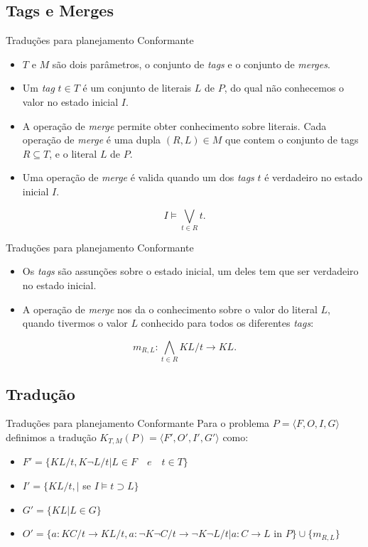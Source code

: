 \subsection{Tags e Merges}
\begin{frame}{Traduções para planejamento Conformante}
\begin{itemize}
\item $T$ e $M$ são dois parâmetros, o conjunto de \textit{tags} e o conjunto de 
\textit{merges}. 
\item Um \textit{tag} $t \in T$ é um conjunto de literais $L$ de $P$, do qual 
não conhecemos o valor no estado inicial $I$. 
\item A operação de \textit{merge} permite obter conhecimento sobre literais. 
Cada operação de \textit{merge} é uma dupla $(R,L) \in M$ que contem o conjunto 
de tags $R \subseteq T$, e o literal $L$ de $P$. 
\item Uma operação de \textit{merge} é valida quando um dos \textit{tags} $t$ é 
verdadeiro no estado inicial $I$. 
\end{itemize}
\begin{equation*}
I \models \bigvee_{t \in R} t.
\end{equation*}
\end{frame}

\begin{frame}{Traduções para planejamento Conformante}
\begin{itemize}
\item Os \textit{tags} são assunções sobre o estado inicial, um deles tem que 
ser verdadeiro no estado inicial.
\item A operação de \textit{merge} nos da o conhecimento sobre o valor do 
literal $L$, quando tivermos o valor $L$ conhecido para todos os diferentes 
\textit{tags}:
\end{itemize}
\begin{equation*}
m_{R,L} : \bigwedge_{t \in R} KL/t \rightarrow KL.
\end{equation*}
\end{frame}

\subsection{Tradução}
\begin{frame}{Traduções para planejamento Conformante}
Para o problema $P=\langle F, O, I, G\rangle$ definimos a tradução $K_{T,M}(P) = 
\langle F', O', I', G'\rangle$ como:
\begin{itemize}
\item $F' = \lbrace KL/t, K\lnot L/t \vert L \in F \quad e \quad t \in T 
\rbrace$
\item $I' = \lbrace KL/t, \vert$ se $I \models t \supset L  \rbrace$ 
\item $G' = \lbrace KL \vert L \in G \rbrace$
\item $O' = \lbrace a: KC/t \rightarrow KL/t, a: \lnot K \lnot C / t \rightarrow 
\lnot K \lnot L/t \vert a: C \rightarrow L$ in $P \rbrace \cup \lbrace m_{R,L} 
\rbrace$ 
\end{itemize}
\end{frame}

